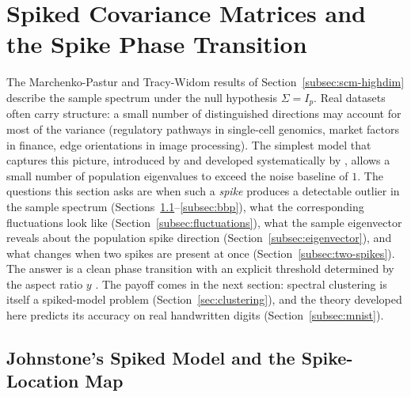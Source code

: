 
\section{Spiked Covariance Matrices and the Spike Phase Transition}\label{sec:spiked}

The Marchenko-Pastur and Tracy-Widom results of Section~\ref{subsec:scm-highdim} describe the sample spectrum under the null hypothesis \(\Sigma = I_p\). Real datasets often carry structure: a small number of distinguished directions may account for most of the variance (regulatory pathways in single-cell genomics, market factors in finance, edge orientations in image processing). The simplest model that captures this picture, introduced by \citet{Johnstone2001} and developed systematically by \citet[][Ch.~11]{YaoZhengBai2015}, allows a small number of population eigenvalues to exceed the noise baseline of \(1\). The questions this section asks are when such a \emph{spike} produces a detectable outlier in the sample spectrum (Sections~\ref{subsec:johnstone}--\ref{subsec:bbp}), what the corresponding fluctuations look like (Section~\ref{subsec:fluctuations}), what the sample eigenvector reveals about the population spike direction (Section~\ref{subsec:eigenvector}), and what changes when two spikes are present at once (Section~\ref{subsec:two-spikes}). The answer is a clean phase transition with an explicit threshold determined by the aspect ratio \(y\) \citep{BaikBenArousPeche2005, BaikSilverstein2006}. The payoff comes in the next section: spectral clustering is itself a spiked-model problem (Section~\ref{sec:clustering}), and the theory developed here predicts its accuracy on real handwritten digits (Section~\ref{subsec:mnist}).

\subsection{Johnstone's Spiked Model and the Spike-Location Map}\label{subsec:johnstone}

